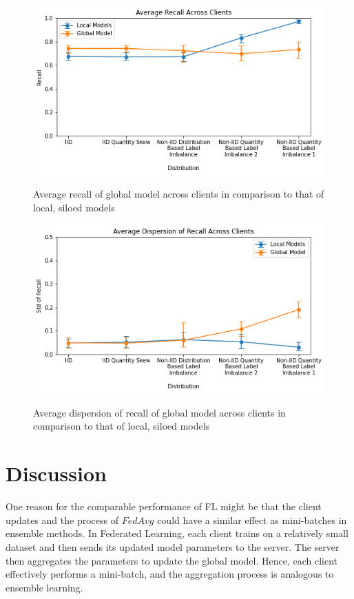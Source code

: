 \documentclass[letterpaper]{article} %
\begin{document}
\begin{figure}[hbt!]
{\includegraphics[width=\columnwidth]{Avg_recall_of_local_models_against_that_of_global_model}}
\caption{Average recall of global model across clients in comparison to that of local, siloed models}
\end{figure}

\begin{figure}[hbt!]
{\includegraphics[width=\columnwidth]{Avg_dispersion_of_recall_of_local_models_against_that_of_global_model}}
\caption{Average dispersion of recall of global model across clients in comparison to that of local, siloed models}
\end{figure}

\bigskip
\section{Discussion}

One reason for the comparable performance of FL might be that the client updates and the process of $FedAvg$ could have a similar effect as mini-batches in ensemble methods. In Federated Learning, each client trains on a relatively small dataset and then sends its updated model parameters to the server. The server then aggregates the parameters to update the global model. Hence, each client effectively performs a mini-batch, and the aggregation process is analogous to ensemble learning.
\end{document}

